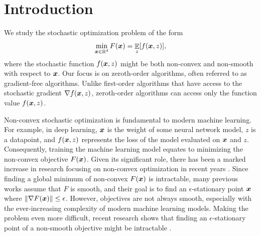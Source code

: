 \section{Introduction}
\label{sec:DP-O2NC_intro}


We study the stochastic optimization problem of the form
\begin{equation*}
    \min_{{\boldsymbol{x}}\in\mathbb R^d} F({\boldsymbol{x}}) = \mathop{\mathbb{E}}_z[f({\boldsymbol{x}},z)],
\end{equation*}
where the stochastic function $f({\boldsymbol{x}},z)$ might be both non-convex and non-smooth with respect to ${\boldsymbol{x}}$. Our focus is on zeroth-order algorithms, often referred to as gradient-free algorithms. Unlike first-order algorithms that have access to the stochastic gradient $\nabla f({\boldsymbol{x}},z)$, zeroth-order algorithms can access only the function value $f({\boldsymbol{x}},z)$.


Non-convex stochastic optimization is fundamental to modern machine learning. For example, in deep learning, ${\boldsymbol{x}}$ is the weight of some neural network model, $z$ is a datapoint, and $f({\boldsymbol{x}},z)$ represents the loss of the model evaluated on ${\boldsymbol{x}}$ and $z$.
Consequently, training the machine learning model equates to minimizing the non-convex objective $F({\boldsymbol{x}})$.
Given its significant role, there has been a marked increase in research focusing on non-convex optimization in recent years \citep{ghadimi2013stochastic, arjevani2019lower, arjevani2020second, carmon2019lower, fang2018spider, cutkosky2019momentum}. 
Since finding a global minimum of non-convex $F({\boldsymbol{x}})$ is intractable, many previous works assume that $F$ is smooth, and their goal is to find an $\epsilon$-stationary point ${\boldsymbol{x}}$ where $\|\nabla F({\boldsymbol{x}})\| \le \epsilon$. 
However, objectives are not always smooth, especially with the ever-increasing complexity of modern machine learning models.
Making the problem even more difficult, 
recent research shows that 
finding an $\epsilon$-stationary point of a non-smooth objective might be intractable \citep{zhang2020complexity, kornowski2022oracle}.

